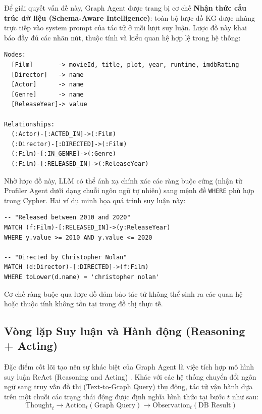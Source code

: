 Để giải quyết vấn đề này, Graph Agent được trang bị cơ chế \textbf{Nhận thức cấu trúc dữ liệu (Schema-Aware Intelligence)}: toàn bộ lược đồ KG được nhúng trực tiếp vào system prompt của tác tử ở mỗi lượt suy luận. Lược đồ này khai báo đầy đủ các nhãn nút, thuộc tính và kiểu quan hệ hợp lệ trong hệ thống:

\begin{verbatim}
Nodes:
  [Film]       -> movieId, title, plot, year, runtime, imdbRating
  [Director]   -> name
  [Actor]      -> name
  [Genre]      -> name
  [ReleaseYear]-> value

Relationships:
  (:Actor)-[:ACTED_IN]->(:Film)
  (:Director)-[:DIRECTED]->(:Film)
  (:Film)-[:IN_GENRE]->(:Genre)
  (:Film)-[:RELEASED_IN]->(:ReleaseYear)
\end{verbatim}

Nhờ lược đồ này, LLM có thể ánh xạ chính xác các ràng buộc cứng (nhận từ Profiler Agent dưới dạng chuỗi ngôn ngữ tự nhiên) sang mệnh đề \texttt{WHERE} phù hợp trong Cypher. Hai ví dụ minh họa quá trình suy luận này:

\begin{verbatim}
-- "Released between 2010 and 2020"
MATCH (f:Film)-[:RELEASED_IN]->(y:ReleaseYear)
WHERE y.value >= 2010 AND y.value <= 2020

-- "Directed by Christopher Nolan"
MATCH (d:Director)-[:DIRECTED]->(f:Film)
WHERE toLower(d.name) = 'christopher nolan'
\end{verbatim}

Cơ chế ràng buộc qua lược đồ đảm bảo tác tử không thể sinh ra các quan hệ hoặc thuộc tính không tồn tại trong đồ thị thực tế.

\subsection{Vòng lặp Suy luận và Hành động (Reasoning + Acting)}
Đặc điểm cốt lõi tạo nên sự khác biệt của Graph Agent là việc tích hợp mô hình suy luận ReAct (Reasoning and Acting) \cite{yao2022react}. Khác với các hệ thống chuyển đổi ngôn ngữ sang truy vấn đồ thị (Text-to-Graph Query) thụ động, tác tử vận hành dựa trên một chuỗi các trạng thái động được định nghĩa hình thức tại bước $t$ như sau:
\begin{equation}
    \text{Thought}_t \rightarrow \text{Action}_t (\text{Graph Query}) \rightarrow \text{Observation}_t (\text{DB Result})
\end{equation}

